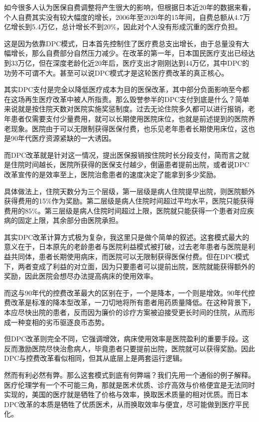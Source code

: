 如今很多人认为医保自费调整将产生很大的影响，但根据日本近20年的数据来看，个人自费其实没有较大幅度的增长，2006年至2020年的15年间，自费总额从4.7万亿增长到5.4万亿，总计增长不到20\%，因此对个人没有形成沉重的医疗负担。

这是因为依靠DPC模式，日本首先控制住了医疗费总支出增长，由于总量没有大幅增长，那么自费部分自然压力减少。在改革的第一年，日本国民医疗支出已经达到33万亿，但在深度老龄化近20年后，医疗支出才刚刚达到44万亿，其中DPC的功劳不可谓不大。甚至可以说DPC模式才是这轮医疗费改革的真正核心。

其实DPC支付是完全以降低医疗成本为目的医保改革，其中部分负面影响至今都在这场再生医疗改革中被人所指责。那么毁誉参半的DPC支付到底是什么？简单来说就是按住院天数对医院实施奖惩制度。过去无论住院多久都可以进行报销，老年患者仅需要支付少量费用，就可以长期使用医院床位，也就是前述提到的医院养老现象。医院由于可以无限制获得医保付费，也乐见老年患者长期使用床位，这也是90年代医疗资源紧缺的一大诱因。

而DPC改革就是针对这一情况，提出医保报销按住院时长分段支付，简而言之就是住院时间越长，医院所获得的医保支付越少，倒逼患者提前出院，或者说DPC改革宣传的是效率至上，医院治愈患者的速度决定了能拿到多少奖励。

具体做法上，住院天数分为三个层级，第一层级是病人住院提早出院，则医院额外获得费用的15\%作为奖励。第二层级是病人住院时间超过平均水平，医院只能获得费用的85\%。第三层级是病人住院时间超过上限，医院就只能获得一个患者对应疾病的固定上限，其余部分由医院承担。

其实DPC改革计算方式极为复杂，我这里只是做个简单的叙述。这套模式最大的意义在于，日本原先的老龄患者与医院利益模式被打破，过去老年患者与医院是利益共同体，患者长期使用病床，而医院可以无限制获得医保付费。但在DPC模式下，两者变成了利益的对立面，因为只要患者可以提前出院，医院就能获得额外的奖励，因此医院会想尽办法提高病床的使用效率。

而这与90年代的控费改革最大的区别在于，一个是降本，一个则是增效。90年代控费改革是标准的降本型改革，一刀切地将所有患者用药质量降低。在这种背景下，本应尽快出院的患者，反而因为廉价的诊疗方案被迫接受更长时间的住院，从而形成一种变相的劣币驱逐良币态势。

但DPC改革则完全不同，它强调增效，病床使用效率是医院盈利的重要手段。这反而激励医院尽快治愈病人，毕竟患者只要提前出院，医院就可以获得奖励。因此DPC与控费改革看似相同，但其从底层上是两套运行逻辑。

然而有利必然有弊。那么这套模式到底有何弊端？我们先用一个通俗的例子解释。医疗伦理学有一个不可能三角，那就是医术优质、诊疗高效与价格便宜是无法同时实现的，美国的医疗就是牺牲了价格与效率，换取医术质量的相对优质。而日本DPC改革的本质是牺牲了优质医术，从而换取效率与便宜，尽可能做到医疗平民化。

